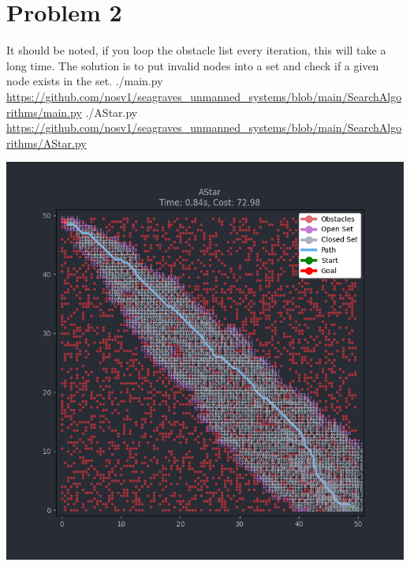 \documentclass{article}
\begin{document}
        \section*{Problem 2}
            \begin{minipage}{\linewidth}
                \raggedright
                It should be noted, if you loop the obstacle list every iteration, this will take a long time. The solution is to put invalid nodes into a set and check if a given node exists in the set. \break 
                \break
                ./main.py \break
                \url{https://github.com/nosv1/seagraves_unmanned_systems/blob/main/SearchAlgorithms/main.py} \break
                ./AStar.py \break
                \url{https://github.com/nosv1/seagraves_unmanned_systems/blob/main/SearchAlgorithms/AStar.py}
                \begin{center}
                    \includegraphics[width=\linewidth]{HW3P2 AStar.png}
                \end{center}
            \end{minipage}
\end{document}
